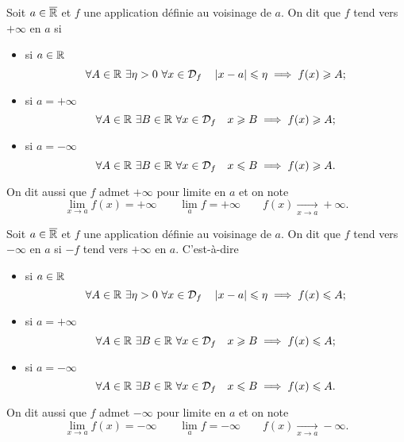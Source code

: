 \begin{defdef}
  Soit \(a \in \overline{\mathbb{R}}\) et \(f\) une application définie au voisinage de \(a\).
  On dit que \(f\) tend vers \(+\infty\) en \(a\) si
  \begin{itemize}
    \item si \(a \in \mathbb{R}\)
      \begin{equation}
        \forall A \in \mathbb{R} \ \exists \eta > 0 \ \forall x \in \mathcal{D}_{f} \quad
        \left\lvert x-a\right\rvert \leqslant \eta \implies f(x) \geqslant A;
      \end{equation}
    \item si \(a= + \infty\)
      \begin{equation}
        \forall A \in \R \ \exists B \in \R \ \forall x \in \Def{f} \quad x
        \geqslant B \implies f(x) \geqslant A;
      \end{equation}
    \item si \(a= - \infty\)
      \begin{equation}
        \forall A \in \R \ \exists B \in \R \ \forall x \in \Def{f} \quad x
        \leqslant B \implies f(x) \geqslant A.
      \end{equation}
  \end{itemize}
  On dit aussi que \(f\) admet \(+\infty\) pour limite en \(a\) et on note
  \begin{equation}
    \lim\limits_{x \to a}f(x)=+\infty \qquad \lim\limits_{a}f=+\infty \qquad
    f(x) \underset{x \to a}{\longrightarrow} +\infty.
  \end{equation}
\end{defdef}
\begin{defdef}
  Soit \(a \in \overline{\mathbb{R}}\) et \(f\) une application définie au voisinage de \(a\).
  On dit que \(f\) tend vers \(-\infty\) en \(a\) si \(-f\) tend vers
  \(+\infty\) en \(a\). C'est-à-dire
  \begin{itemize}
    \item si \(a \in \mathbb{R}\)
      \begin{equation}
        \forall A \in \mathbb{R} \ \exists \eta > 0 \ \forall x \in \mathcal{D}_{f} \quad
        \left\lvert x-a\right\rvert \leqslant \eta \implies f(x) \leqslant A;
      \end{equation}
    \item si \(a= + \infty\)
      \begin{equation}
        \forall A \in \R \ \exists B \in \R \ \forall x \in \Def{f} \quad x
        \geqslant B \implies f(x) \leqslant A;
      \end{equation}
    \item si \(a= - \infty\)
      \begin{equation}
        \forall A \in \R \ \exists B \in \R \ \forall x \in \Def{f} \quad x
        \leqslant B \implies f(x) \leqslant A.
      \end{equation}
  \end{itemize}
  On dit aussi que \(f\) admet \(-\infty\) pour limite en \(a\) et on note
  \begin{equation}
    \lim\limits_{x \to a}f(x)=-\infty \qquad \lim\limits_{a}f=-\infty \qquad
    f(x) \underset{x \to a}{\longrightarrow} -\infty.
  \end{equation}
\end{defdef}
